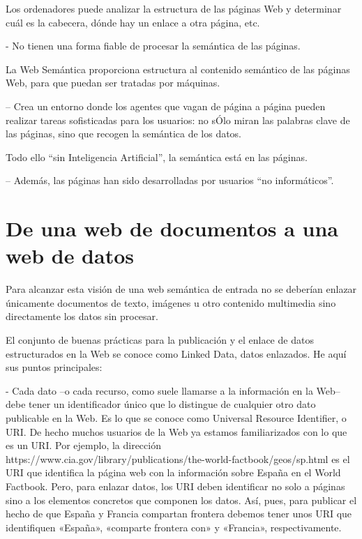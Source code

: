 Los ordenadores puede analizar la estructura de las páginas Web y determinar cuál es la cabecera, dónde hay un enlace a otra página, etc.

- No tienen una forma fiable de procesar la semántica de las páginas.

La Web Semántica proporciona estructura al contenido semántico de las páginas Web, para que puedan ser tratadas por máquinas.

– Crea un entorno donde los agentes que vagan de página a página pueden realizar tareas sofisticadas para los usuarios: no sÓlo miran las palabras clave de las páginas, sino que recogen la semántica de los datos.

Todo ello “sin Inteligencia Artificial”, la semántica está en las páginas. 

– Además, las páginas han sido desarrolladas por usuarios “no informáticos”.







\section{De una web de documentos a una web de datos}

Para alcanzar esta visión de una web semántica de entrada no se deberían enlazar únicamente documentos de texto, imágenes u otro contenido multimedia sino directamente los datos sin procesar.%

El conjunto de buenas prácticas para la publicación y el enlace de datos estructurados en la Web se conoce como Linked Data, datos enlazados. He aquí sus puntos principales:


- Cada dato –o cada recurso, como suele llamarse a la información en la Web– debe tener un identificador único que lo distingue de cualquier otro dato publicable en la Web. Es lo que se conoce como Universal Resource Identifier, o URI. De hecho muchos usuarios de la Web ya estamos familiarizados con lo que es un URI. Por ejemplo, la dirección https://www.cia.gov/library/publications/the-world-factbook/geos/sp.html es el URI que identifica la página web con la información sobre España en el World Factbook. Pero, para enlazar datos, los URI deben identificar no solo a páginas sino a los elementos concretos que componen los datos. Así, pues, para publicar el hecho de que España y Francia compartan frontera debemos tener unos URI que identifiquen «España», «comparte frontera con» y «Francia», respectivamente.

